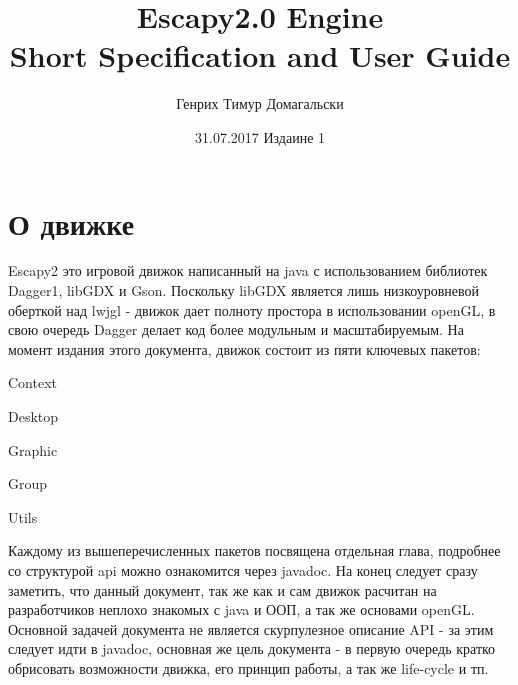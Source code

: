 \documentclass[11pt]{report}
\title{
	\textbf{Escapy2.0 Engine\\Short Specification and User Guide}
}
\author{Генрих Тимур Домагальски}
\date{31.07.2017 Издаине 1}
\newenvironment{enumerate*}%
  {\begin{enumerate}%
    \setlength{\itemsep}{2pt}%
    \setlength{\parskip}{0.75pt}}%
  {\end{enumerate}}
\begin{document}
\maketitle

\tableofcontents

\newpage

\chapter*{О движке}
Escapy2 это игровой движок написанный на java с использованием библиотек Dagger1, libGDX и Gson. Поскольку libGDX является лишь низкоуровневой оберткой над lwjgl - движок дает полноту простора в использовании openGL, в свою очередь Dagger делает код более модульным и масштабируемым. На момент издания этого документа, движок состоит из пяти ключевых пакетов: \begin{enumerate*}
	\item Context
	\item Desktop
	\item Graphic
	\item Group
	\item Utils
\end{enumerate*}
Каждому из вышеперечисленных пакетов посвящена отдельная глава, подробнее со структурой api можно ознакомится через javadoc. На конец следует сразу заметить, что данный документ, так же как и сам движок расчитан на разработчиков неплохо знакомых с java и ООП, а так же основами openGL. Основной задачей документа не является скурпулезное описание API - за этим следует идти в javadoc, основная же цель документа - в первую очередь кратко обрисовать возможности движка, его принцип работы, а так же life-cycle и тп.
\end{document}
